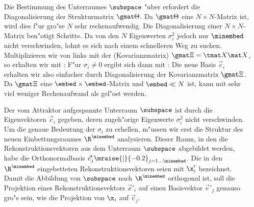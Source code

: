
Die Bestimmung des Unterraumes $\subspace$ "uber  erfordert die
Diagonalisierung der Strukturmatrix $\gmat \Theta$. Da $\gmat \Theta$ eine $N\times
N$-Matrix ist, wird dies f"ur gro"se $N$ sehr rechenaufwendig. Die Diagonalisierung einer
$N\times N$-Matrix ben"otigt  Schritte.  Da von den $N$ Eigenwerten
$\sigma_i^2$ jedoch nur $\minembed$ nicht verschwinden, lohnt es sich nach einem
schnelleren Weg zu suchen.  Multiplizieren wir  von links mit der
\begriff(Kovarianzmatrix) $\gmat \Xi = \tmat X \mat X$, so erhalten wir mit
:
F"ur $\sigma_i\neq 0$ ergibt sich dann mit :
Die neue Basis $\vec c_i$ erhalten wir  
also einfacher durch Diagonalisierung der Kovarianzmatrix $\gmat \Xi$. Da $\gmat \Xi$ eine
$\embed\times\embed$-Matrix und $\embed\ll N$ ist, kann  mit sehr viel
weniger Rechenaufwand als  gel"ost werden.

Der vom Attraktor aufgespannte Unterraum $\subspace$ ist durch die Eigenvektoren $\vec
c_i$ gegeben, deren zugeh"orige Eigenwerte $\sigma_i^2$ nicht verschwinden. Um die genaue
Bedeutung der $\sigma_i$ zu erhellen, m"ussen wir erst die Struktur des neuen
Einbettungsraumes $\R^\minembed$ analysieren. Dieser Raum, in den die
Rekonstruktionsvektoren aus dem Unterraum $\subspace$ abgebildet werden, habe die
Orthonormalbasis $\vec e'_j\mraise{\rvert}{-0.2}_{j=1\dots\minembed}$.  Die in den 
$\R^\minembed$ eingebetteten Rekonstruktionsvektoren seien mit $\x'_i$ bezeichnet. Damit
die Abbildung von $\subspace$ nach $\R^\minembed$ orthogonal ist, soll die Projektion eines Rekonstruktionsvektors $\vec x'_i$
auf einen Basisvektor $\vec e'_j$ genauso gro"s sein, wie die Projektion von $\x_i$ auf
$\vec c_j$.


